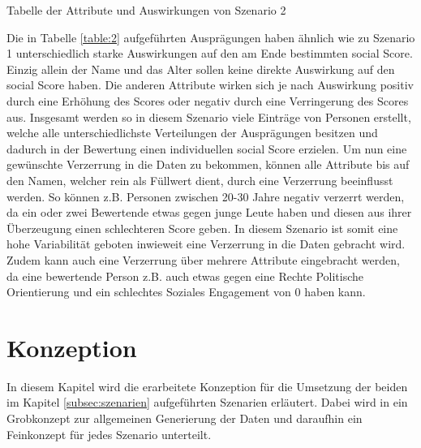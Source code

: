 \begin{onehalfspace}
\begin{table}[!h]
\caption{Tabelle der Attribute und Auswirkungen von Szenario 2}
\label{table:2}
\end{table}
Die in Tabelle \ref*{table:2} aufgeführten Ausprägungen haben ähnlich wie zu Szenario 1 unterschiedlich starke Auswirkungen auf den am Ende bestimmten social Score. Einzig allein der Name und das Alter sollen keine direkte Auswirkung auf den social Score haben. Die anderen Attribute wirken sich je nach Auswirkung positiv durch eine Erhöhung des Scores oder negativ durch eine Verringerung des Scores aus.
Insgesamt werden so in diesem Szenario viele Einträge von Personen erstellt, welche alle unterschiedlichste Verteilungen der Ausprägungen besitzen und dadurch in der Bewertung einen individuellen social Score erzielen. Um nun eine gewünschte Verzerrung in die Daten zu bekommen, können alle Attribute bis auf den Namen, welcher rein als Füllwert dient, durch eine Verzerrung beeinflusst werden. So können z.B. Personen zwischen 20-30 Jahre negativ verzerrt werden, da ein oder zwei Bewertende etwas gegen junge Leute haben und diesen aus ihrer Überzeugung einen schlechteren Score geben. In diesem Szenario ist somit eine hohe Variabilität geboten inwieweit eine Verzerrung in die Daten gebracht wird. Zudem kann auch eine Verzerrung über mehrere Attribute eingebracht werden, da eine bewertende Person z.B. auch etwas gegen eine Rechte Politische Orientierung und ein schlechtes Soziales Engagement von 0 haben kann. 
\section{Konzeption}
\label{subsection:konzeption}
In diesem Kapitel wird die erarbeitete Konzeption für die Umsetzung der beiden im Kapitel \ref*{subsec:szenarien} aufgeführten Szenarien erläutert. Dabei wird in ein Grobkonzept zur allgemeinen Generierung der Daten und daraufhin ein Feinkonzept für jedes Szenario unterteilt.

\end{onehalfspace}
